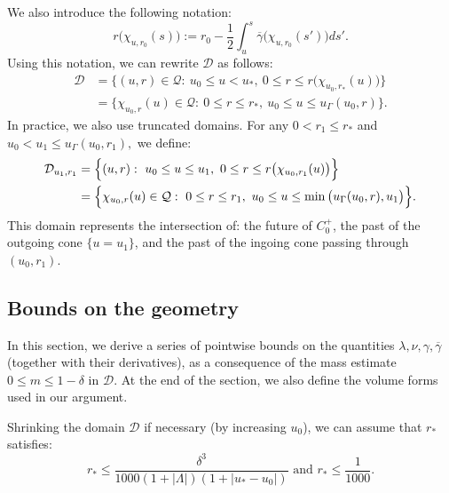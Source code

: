 \documentclass[11pt]{article}
\numberwithin{equation}{section}
\begin{document}
We also introduce the following notation:
\[r\big(\chi_{u,r_0}(s)\big):=r_0-\frac{1}{2}\int_{u}^s\overline{\gamma}\big(\chi_{u,r_0}(s')\big)ds'.\]
Using this notation, we can rewrite $\mathcal{D}$ as follows:
\begin{align*}
    \mathcal{D}&=\Big\{(u,r)\in\mathcal{Q}:\ u_0\leq u<u_*,\ 0\leq r\leq r\big(\chi_{u_0,r_*}(u)\big)\Big\}\\
    &=\Big\{\chi_{u_0,r}(u)\in\mathcal{Q}:\ 0\leq r\leq r_*,\ u_0\leq u\leq u_{\Gamma}(u_0,r) \Big\}.
\end{align*}
In practice, we also use truncated domains. For any $0<r_1\leq r_*$ and $u_0<u_1\leq u_{\Gamma}(u_0,r_1),$ we define:
\begin{align}
    \mathcal{D}_{u_1,r_1}&=\Big\{(u,r):\ u_0\leq u\leq u_1,\ 0\leq r\leq r\big(\chi_{u_0,r_1}(u)\big)\Big\}\label{truncated domain definition}\\
    &=\Big\{\chi_{u_0,r}(u)\in\mathcal{Q}:\ 0\leq r\leq r_1,\ u_0\leq u\leq \min\big(u_{\Gamma}(u_0,r),u_1\big)\Big\}.\notag
\end{align}
This domain represents the intersection of: the future of $C_0^+$, the past of the outgoing cone $\{u=u_1\}$, and the past of the ingoing cone passing through $(u_0,r_1).$


\subsection{Bounds on the geometry}\label{bounds on geometry section}

In this section, we derive a series of pointwise bounds on the quantities $\lambda,\nu,\gamma,\overline{\gamma}$ (together with their derivatives), as a consequence of the mass estimate $0\leq m\leq 1-\delta$ in $\mathcal{D}.$ At the end of the section, we also define the volume forms used in our argument. 

Shrinking the domain $\mathcal{D}$ if necessary (by increasing $u_0$), we can assume that $r_*$ satisfies:
\begin{equation}\label{bound on r*}
    r_*\leq\frac{\delta^3}{1000(1+|\Lambda|)(1+|u_*-u_0|)}\text{ and }r_*\leq\frac{1}{1000}.
\end{equation}
\end{document}
